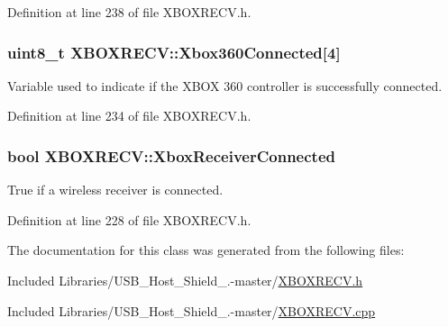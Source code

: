 \-Definition at line 238 of file \-X\-B\-O\-X\-R\-E\-C\-V.\-h.

\hypertarget{class_x_b_o_x_r_e_c_v_ac07faada38e159f1e7831d90863ebe3a}{
\subsubsection[{\-Xbox360\-Connected}]{\setlength{\rightskip}{0pt plus 5cm}uint8\-\_\-t {\bf \-X\-B\-O\-X\-R\-E\-C\-V\-::\-Xbox360\-Connected}\mbox{[}4\mbox{]}}}\label{class_x_b_o_x_r_e_c_v_ac07faada38e159f1e7831d90863ebe3a}
\-Variable used to indicate if the \-X\-B\-O\-X 360 controller is successfully connected. 

\-Definition at line 234 of file \-X\-B\-O\-X\-R\-E\-C\-V.\-h.

\hypertarget{class_x_b_o_x_r_e_c_v_a5ff16bba78f05af3023f395a342b625c}{
\subsubsection[{\-Xbox\-Receiver\-Connected}]{\setlength{\rightskip}{0pt plus 5cm}bool {\bf \-X\-B\-O\-X\-R\-E\-C\-V\-::\-Xbox\-Receiver\-Connected}}}\label{class_x_b_o_x_r_e_c_v_a5ff16bba78f05af3023f395a342b625c}
\-True if a wireless receiver is connected. 

\-Definition at line 228 of file \-X\-B\-O\-X\-R\-E\-C\-V.\-h.



\-The documentation for this class was generated from the following files\-:\begin{DoxyCompactItemize}
\item 
\-Included Libraries/\-U\-S\-B\-\_\-\-Host\-\_\-\-Shield\-\_.-\/master/\hyperlink{_x_b_o_x_r_e_c_v_8h}{\-X\-B\-O\-X\-R\-E\-C\-V.\-h}\item 
\-Included Libraries/\-U\-S\-B\-\_\-\-Host\-\_\-\-Shield\-\_.-\/master/\hyperlink{_x_b_o_x_r_e_c_v_8cpp}{\-X\-B\-O\-X\-R\-E\-C\-V.\-cpp}\end{DoxyCompactItemize}
